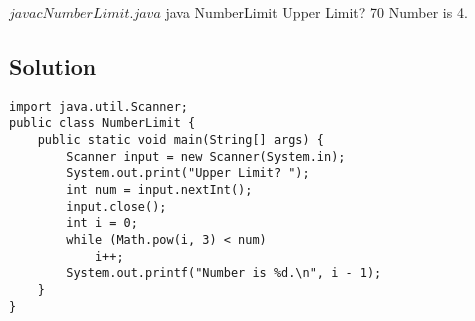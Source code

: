 \begin{terminal}
$ javac NumberLimit.java
$ java NumberLimit
Upper Limit? 70
Number is 4.
\end{terminal}

\subsection*{Solution}

\lstset{language=Java,tabsize=4}
\begin{lstlisting}
import java.util.Scanner;
public class NumberLimit {
	public static void main(String[] args) {
		Scanner input = new Scanner(System.in);
		System.out.print("Upper Limit? ");
		int num = input.nextInt();
		input.close();
		int i = 0;
		while (Math.pow(i, 3) < num)
			i++;
		System.out.printf("Number is %d.\n", i - 1);
	}
}
\end{lstlisting}
